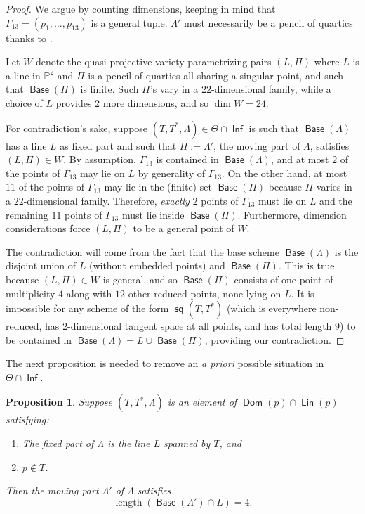 \documentclass[reqno, 11pt]{amsart}
\theoremstyle{plain}
\newtheorem{proposition}[theorem]{Proposition}
\theoremstyle{remark}
\renewcommand{\P}{\mathbb{P}}
\DeclareMathOperator{\s}{\mathsf{sq}}
\DeclareMathOperator{\Dom}{\mathsf{Dom}}
\DeclareMathOperator{\Inf}{\mathsf{Inf}}
\DeclareMathOperator{\Lin}{\mathsf{Lin}}
\DeclareMathOperator{\Base}{\mathsf{Base}}
\DeclareMathOperator{\length}{length}
\begin{document}
\begin{proof}
We argue by counting dimensions, keeping in mind that $\Gamma_{13} = (p_1, \dots, p_{13})$ is a general tuple. $\Lambda'$ must necessarily be a pencil of quartics thanks to .

Let $W$ denote the quasi-projective variety parametrizing pairs $(L,\Pi)$ where $L$ is a line in $\P^{2}$ and $\Pi$ is a pencil of quartics all sharing a singular point, and such that $\Base(\Pi)$ is finite. Such $\Pi$'s vary in a $22$-dimensional family, while a choice of $L$ provides $2$ more dimensions, and so $\dim W = 24$. 

For contradiction's sake, suppose $(T,T^{*},\Lambda) \in \Theta \cap \Inf$ is such that $\Base(\Lambda)$ has a line $L$ as fixed part and such that $\Pi := \Lambda'$, the moving part of $\Lambda$, satisfies $(L,\Pi) \in W$. By assumption, $\Gamma_{13}$ is contained in $\Base(\Lambda)$, and at most $2$ of the points of $\Gamma_{13}$ may lie on $L$ by generality of $\Gamma_{13}$.  On the other hand, at most $11$ of the points of $\Gamma_{13}$ may lie in the (finite) set $\Base(\Pi)$ because $\Pi$ varies in a $22$-dimensional family. Therefore, {\sl  exactly} $2$ points of $\Gamma_{13}$ must lie on $L$ and the remaining $11$ points of $\Gamma_{13}$ must lie inside $\Base(\Pi)$.  Furthermore, dimension considerations force $(L,\Pi)$ to be a general point of $W$. 

The contradiction will come from the fact that the base scheme $\Base (\Lambda)$ is the disjoint union of $L$ (without embedded points) and $\Base(\Pi)$. This is true because $(L,\Pi) \in W$ is general, and so  $\Base(\Pi)$ consists of one point of multiplicity $4$ along with $12$ other reduced points, none lying on $L$.  It is impossible for any scheme of the form $\s(T,T^{*})$ (which is everywhere non-reduced, has $2$-dimensional tangent space at all points, and has total length $9$) to be contained in $\Base(\Lambda) = L \cup \Base(\Pi)$, providing our contradiction.
\end{proof}

The next proposition is needed to remove an {\sl a priori} possible situation in $\Theta \cap \Inf$.

\begin{proposition}
\label{proposition:LinDom}
Suppose $(T,T^{*},\Lambda)$ is an element of  $\Dom(p) \cap \Lin(p)$ satisfying:
\begin{enumerate}
    \item The fixed part of $\Lambda$ is the line $L$ spanned by $T$, and
    \item $p \notin T$. 
\end{enumerate}
Then the moving part $\Lambda'$ of $\Lambda$ satisfies $$\length \left(\Base(\Lambda') \cap L\right) = 4.$$
\end{proposition}
\end{document}
